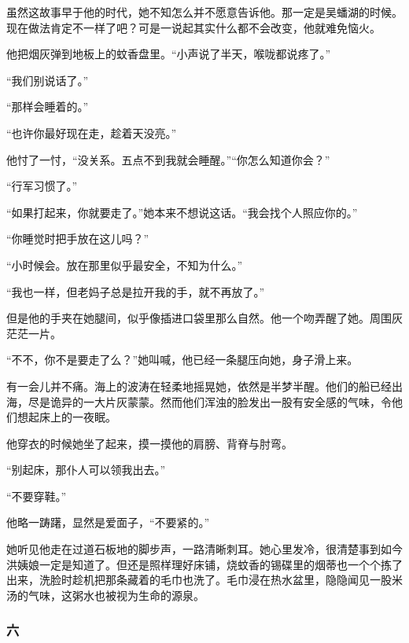 \par 虽然这故事早于他的时代，她不知怎么并不愿意告诉他。那一定是吴蟠湖的时候。现在做法肯定不一样了吧？可是一说起其实什么都不会改变，他就难免恼火。
\par 他把烟灰弹到地板上的蚊香盘里。“小声说了半天，喉咙都说疼了。”
\par “我们别说话了。”
\par “那样会睡着的。”
\par “也许你最好现在走，趁着天没亮。”
\par 他忖了一忖，“没关系。五点不到我就会睡醒。”“你怎么知道你会？”
\par “行军习惯了。”
\par “如果打起来，你就要走了。”她本来不想说这话。“我会找个人照应你的。”
\par “你睡觉时把手放在这儿吗？”
\par “小时候会。放在那里似乎最安全，不知为什么。”
\par “我也一样，但老妈子总是拉开我的手，就不再放了。”
\par 但是他的手夹在她腿间，似乎像插进口袋里那么自然。他一个吻弄醒了她。周围灰茫茫一片。
\par “不不，你不是要走了么？”她叫喊，他已经一条腿压向她，身子滑上来。
\par 有一会儿并不痛。海上的波涛在轻柔地摇晃她，依然是半梦半醒。他们的船已经出海，尽是诡异的一大片灰蒙蒙。然而他们浑浊的脸发出一股有安全感的气味，令他们想起床上的一夜眠。
\par 他穿衣的时候她坐了起来，摸一摸他的肩膀、背脊与肘弯。
\par “别起床，那仆人可以领我出去。”
\par “不要穿鞋。”
\par 他略一踌躇，显然是爱面子，“不要紧的。”
\par 她听见他走在过道石板地的脚步声，一路清晰刺耳。她心里发冷，很清楚事到如今洪姨娘一定是知道了。但还是照样理好床铺，烧蚊香的锡碟里的烟蒂也一个个拣了出来，洗脸时趁机把那条藏着的毛巾也洗了。毛巾浸在热水盆里，隐隐闻见一股米汤的气味，这粥水也被视为生命的源泉。



\subsubsection*{六}


